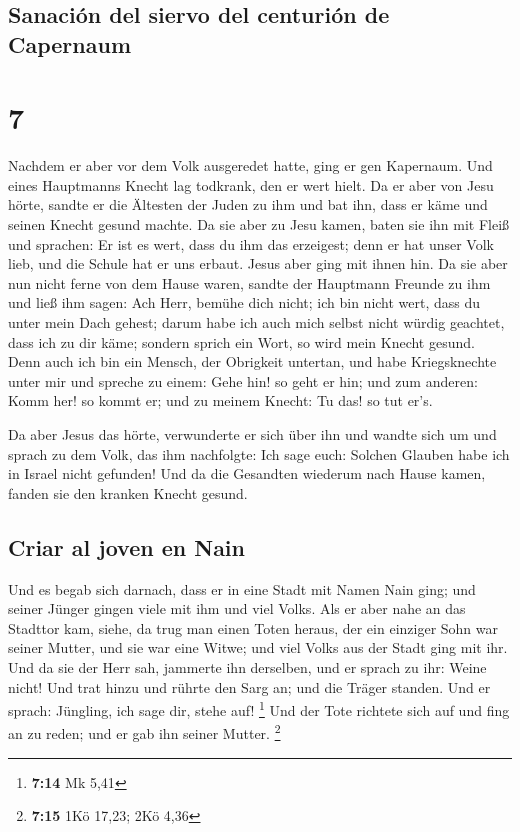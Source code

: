 \hypertarget{sanaciuxf3n-del-siervo-del-centuriuxf3n-de-capernaum}{%
\subsection{Sanación del siervo del centurión de
Capernaum}\label{sanaciuxf3n-del-siervo-del-centuriuxf3n-de-capernaum}}

\hypertarget{section-6}{%
\section{7}\label{section-6}}

 Nachdem er aber vor dem Volk ausgeredet hatte, ging er
gen Kapernaum.  Und eines Hauptmanns Knecht lag todkrank,
den er wert hielt.  Da er aber von Jesu hörte, sandte er
die Ältesten der Juden zu ihm und bat ihn, dass er käme und seinen
Knecht gesund machte.  Da sie aber zu Jesu kamen, baten
sie ihn mit Fleiß und sprachen: Er ist es wert, dass du ihm das
erzeigest;  denn er hat unser Volk lieb, und die Schule
hat er uns erbaut.  Jesus aber ging mit ihnen hin. Da sie
aber nun nicht ferne von dem Hause waren, sandte der Hauptmann Freunde
zu ihm und ließ ihm sagen: Ach Herr, bemühe dich nicht; ich bin nicht
wert, dass du unter mein Dach gehest;  darum habe ich auch
mich selbst nicht würdig geachtet, dass ich zu dir käme; sondern sprich
ein Wort, so wird mein Knecht gesund.  Denn auch ich bin
ein Mensch, der Obrigkeit untertan, und habe Kriegsknechte unter mir und
spreche zu einem: Gehe hin! so geht er hin; und zum anderen: Komm her!
so kommt er; und zu meinem Knecht: Tu das! so tut er's.

 Da aber Jesus das hörte, verwunderte er sich über ihn und
wandte sich um und sprach zu dem Volk, das ihm nachfolgte: Ich sage
euch: Solchen Glauben habe ich in Israel nicht gefunden! 
Und da die Gesandten wiederum nach Hause kamen, fanden sie den kranken
Knecht gesund.

\hypertarget{criar-al-joven-en-nain}{%
\subsection{Criar al joven en Nain}\label{criar-al-joven-en-nain}}

 Und es begab sich darnach, dass er in eine Stadt mit
Namen Nain ging; und seiner Jünger gingen viele mit ihm und viel Volks.
 Als er aber nahe an das Stadttor kam, siehe, da trug man
einen Toten heraus, der ein einziger Sohn war seiner Mutter, und sie war
eine Witwe; und viel Volks aus der Stadt ging mit ihr. 
Und da sie der Herr sah, jammerte ihn derselben, und er sprach zu ihr:
Weine nicht!  Und trat hinzu und rührte den Sarg an; und
die Träger standen. Und er sprach: Jüngling, ich sage dir, stehe auf!
\footnote{\textbf{7:14} Mk 5,41}  Und der Tote richtete
sich auf und fing an zu reden; und er gab ihn seiner Mutter. \footnote{\textbf{7:15}
  1Kö 17,23; 2Kö 4,36}

